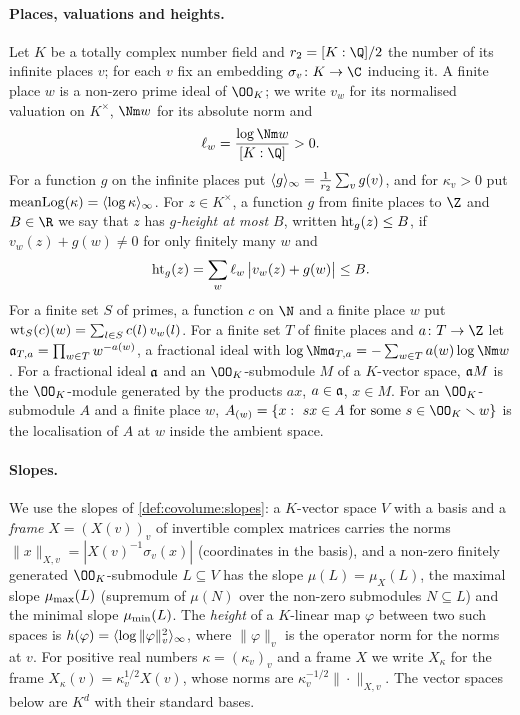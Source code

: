 \paragraph{Places, valuations and heights.}
Let $K$ be a totally complex number field and $r_2=[K:\Q]/2$ the number of its infinite places $v$; for each $v$
fix an embedding $\sigma_v\colon K\to\C$ inducing it. A finite place $w$ is a non-zero prime ideal of $\OO_K$; we
write $v_w$ for its normalised valuation on $K^\times$, $\Nm w$ for its absolute norm and
\[
\ell_w=\frac{\log\Nm w}{[K:\Q]}>0 .
\]
For a function $g$ on the infinite places put $\langle g\rangle_{\infty}=\frac1{r_2}\sum_vg(v)$, and for $\kappa_v>0$ put
$\operatorname{meanLog}(\kappa)=\langle \log\kappa\rangle_{\infty}$. For $z\in K^\times$, a function $g$ from finite places to $\Z$ and $B\in\R$ we
say that $z$ has \emph{$g$-height at most $B$}, written $\operatorname{ht}_g(z)\le B$, if $v_w(z)+g(w)\ne0$ for only finitely
many $w$ and
\[
\operatorname{ht}_g(z)=\sum_w\ell_w\,\bigl|v_w(z)+g(w)\bigr|\le B .
\]
For a finite set $S$ of primes, a function $c$ on $\N$ and a finite place $w$ put
$\operatorname{wt}_S(c)(w)=\sum_{l\in S}c(l)\,v_w(l)$. For a finite set $T$ of finite places and $a\colon T\to\Z$ let
$\mathfrak{a}_{T,a}=\prod_{w\in T}w^{-a(w)}$, a fractional ideal with $\log\Nm\fitden_{T,a}=-\sum_{w\in T}a(w)\log\Nm w$.
For a fractional ideal $\mathfrak{a}$ and an $\OO_K$-submodule $M$ of a $K$-vector space, $\mathfrak{a} M$ is the
$\OO_K$-module generated by the products $ax$, $a\in\mathfrak{a}$, $x\in M$. For an $\OO_K$-submodule $A$ and a finite place
$w$, $A_{(w)}=\{x:\ sx\in A\text{ for some }s\in\OO_K\smallsetminus w\}$ is the localisation of $A$ at $w$ inside the
ambient space.

\paragraph{Slopes.}
We use the slopes of \cref{def:covolume:slopes}: a $K$-vector space $V$ with a basis and a \emph{frame}
$X=(X(v))_v$ of invertible complex matrices carries the norms $\|x\|_{X,v}=|X(v)^{-1}\sigma_v(x)|$ (coordinates in the
basis), and a non-zero finitely generated $\OO_K$-submodule $L\subseteq V$ has the slope $\mu(L)=\mu_X(L)$, the maximal
slope $\mu_{\max}(L)$ (supremum of $\mu(N)$ over the non-zero submodules $N\subseteq L$) and the minimal slope
$\mu_{\min}(L)$. The \emph{height} of a $K$-linear map $\varphi$ between two such spaces is
$h(\varphi)=\langle \log\|\varphi\|_v^2\rangle_{\infty}$, where $\|\varphi\|_v$ is the operator norm for the norms at $v$. For positive
real numbers $\kappa=(\kappa_v)_v$ and a frame $X$ we write $X_\kappa$ for the frame $X_\kappa(v)=\kappa_v^{1/2}X(v)$,
whose norms are $\kappa_v^{-1/2}\|\cdot\|_{X,v}$. The vector spaces below are $K^d$ with their standard bases.


